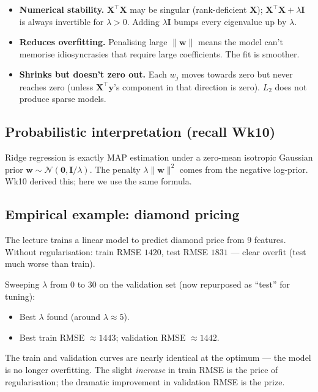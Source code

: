 \documentclass[11pt, a4paper]{article}
\begin{document}
\begin{itemize}
  \item \textbf{Numerical stability.} $\mathbf{X}^\top\mathbf{X}$ may be singular (rank-deficient $\mathbf{X}$); $\mathbf{X}^\top\mathbf{X} + \lambda\mathbf{I}$ is always invertible for $\lambda > 0$. Adding $\lambda\mathbf{I}$ bumps every eigenvalue up by $\lambda$.
  \item \textbf{Reduces overfitting.} Penalising large $\|\mathbf{w}\|$ means the model can't memorise idiosyncrasies that require large coefficients. The fit is smoother.
  \item \textbf{Shrinks but doesn't zero out.} Each $w_j$ moves towards zero but never reaches zero (unless $\mathbf{X}^\top\mathbf{y}$'s component in that direction is zero). $L_2$ does not produce sparse models.
\end{itemize}

\subsection{Probabilistic interpretation (recall Wk10)}

Ridge regression is exactly MAP estimation under a zero-mean isotropic Gaussian prior $\mathbf{w}\sim\mathcal{N}(\mathbf{0}, \mathbf{I}/\lambda)$. The penalty $\lambda\|\mathbf{w}\|^2$ comes from the negative log-prior. Wk10 derived this; here we use the same formula.

\subsection{Empirical example: diamond pricing}

The lecture trains a linear model to predict diamond price from 9 features. Without regularisation: train RMSE $1420$, test RMSE $1831$ — clear overfit (test much worse than train).

Sweeping $\lambda$ from $0$ to $30$ on the validation set (now repurposed as ``test'' for tuning):
\begin{itemize}
  \item Best $\lambda$ found (around $\lambda \approx 5$).
  \item Best train RMSE $\approx 1443$; validation RMSE $\approx 1442$.
\end{itemize}
The train and validation curves are nearly identical at the optimum — the model is no longer overfitting. The slight \emph{increase} in train RMSE is the price of regularisation; the dramatic improvement in validation RMSE is the prize.
\end{document}
